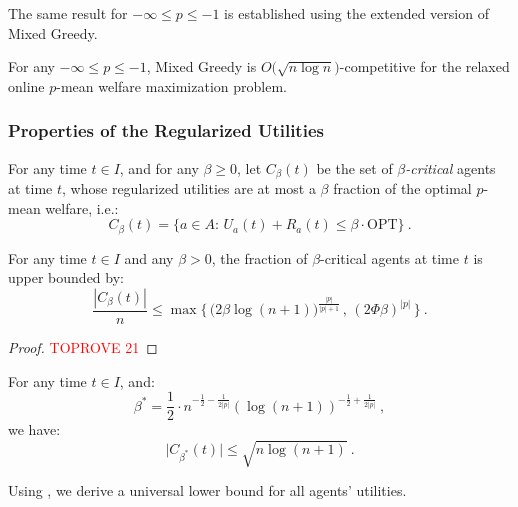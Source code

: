 \documentclass[11pt,letterpaper]{article}
\newcommand{\OPT}{\mathrm{OPT}}
\newcommand{\utility}{U}
\newcommand{\regularizer}{R}
\begin{document}
The same result for $-\infty \le p\le -1$ is established using the extended version of Mixed Greedy.


\begin{theorem}
	\label{thm:harmonic-to-egalitarian-app}
	For any $-\infty \le p \le -1$, Mixed Greedy is $O \big( \sqrt{n \log n} \big)$-competitive for the relaxed online $p$-mean welfare maximization problem.
\end{theorem}


\subsubsection{Properties of the Regularized Utilities}


\begin{definition}
	For any time $t \in I$, and for any $\beta  \geq 0$, let $C_\beta(t)$ be the set of \emph{$\beta$-critical} agents at time $t$, whose regularized utilities are at most a $\beta$ fraction of the optimal $p$-mean welfare, i.e.:
	\[
	C_{\beta}(t) = \Big\{a\in A:\,\utility_a(t)+\regularizer_a(t) \leq \beta \cdot \OPT \Big\}
	~.
	\]
\end{definition}

\begin{lemma}
	\label{lem:critical-agent-number-app}
	For any time $t\in I$ and any $\beta > 0$, the fraction of $\beta$-critical agents at time $t$ is upper bounded by:
	\[
	\frac{|C_\beta(t)|}{n} \le \max \Big\{ \, \big(2 \beta \log(n+1) \big)^{\frac{|p|}{|p|+1}} \,,\, (2\Phi\beta)^{|p|} \,\Big\}
	~.
	\]
\end{lemma}

\begin{proof}\textcolor{red}{TOPROVE 21}\end{proof}

\begin{corollary}
	\label{cor:critical-threshold-app}
	For any time $t \in I$, and:
	\begin{equation}
		\label{eq:beta-star-app}
		\beta^* = \frac{1}{2} \cdot  n^{-\frac{1}{2}-\frac{1}{2|p|}} (\log (n+1))^{-\frac{1}{2}+\frac{1}{2|p|}}
		~,	
	\end{equation}
	we have:
	\[
	\big|C_{\beta^*} (t)\big| \le \sqrt{n \log (n+1)}
	~.
	\]
\end{corollary}

Using , we derive a universal lower bound for all agents' utilities.
\end{document}
